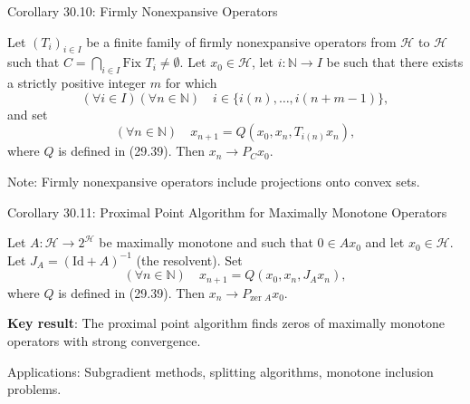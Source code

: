 \documentclass[aspectratio=169,10pt]{beamer}
\begin{document}

\begin{frame}{Corollary 30.10: Firmly Nonexpansive Operators}
  \begin{corollary}
    Let $(T_i)_{i \in I}$ be a finite family of firmly nonexpansive operators from $\mathcal{H}$ to $\mathcal{H}$ such that $C = \bigcap_{i \in I} \text{Fix } T_i \neq \emptyset$. Let $x_0 \in \mathcal{H}$, let $i: \mathbb{N} \to I$ be such that there exists a strictly positive integer $m$ for which
    \[
      (\forall i \in I)(\forall n \in \mathbb{N}) \quad i \in \{i(n), \ldots, i(n+m-1)\},
    \]
    and set
    \[
      (\forall n \in \mathbb{N}) \quad x_{n+1} = Q(x_0, x_n, T_{i(n)} x_n),
    \]
    where $Q$ is defined in (29.39). Then $x_n \to P_C x_0$.
  \end{corollary}

  Note: Firmly nonexpansive operators include projections onto convex sets.
\end{frame}


\begin{frame}{Corollary 30.11: Proximal Point Algorithm for Maximally Monotone Operators}
  \begin{corollary}
    Let $A: \mathcal{H} \to 2^{\mathcal{H}}$ be maximally monotone and such that $0 \in A x_0$ and let $x_0 \in \mathcal{H}$. Let $J_A = (\text{Id} + A)^{-1}$ (the resolvent). Set
    \[
      (\forall n \in \mathbb{N}) \quad x_{n+1} = Q(x_0, x_n, J_A x_n),
    \]
    where $Q$ is defined in (29.39). Then $x_n \to P_{\text{zer } A} x_0$.
  \end{corollary}

  \vspace{0.3cm}

  \textbf{Key result}: The proximal point algorithm finds zeros of maximally monotone operators with strong convergence.

  \vspace{0.3cm}

  Applications: Subgradient methods, splitting algorithms, monotone inclusion problems.
\end{frame}

\end{document}
